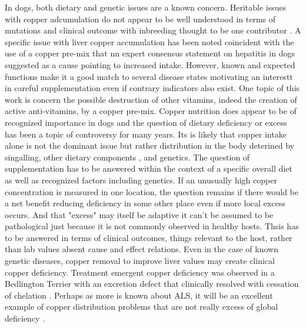 {In dogs, both dietary and genetic issues are a known concern.
Heritable issues with copper adcumulation do not appear to be
well understood in terms of mutations and clinical outcome with inbreeding
thought to be one contributor \cite{PMC3275736}.
A specific issue with liver copper accumulation has
been noted coincident with  the use of a copper pre-mix
that nn expert consensus statement on hepatitis in dogs suggested 
as a cause \cite{PMC6524396} pointing to increased intake. 
However,  known and expected functions
make it a good   match to several  disease states  
motivating an interestt in careful supplementation even if contrary
indicators also exist.  One topic of this work is  concern the possible
destruction of other vitamins, indeed the creation of active
anti-vitamins,  by a copper pre-mix. 
Copper nutrition does appear to be of recognized importance in dogs
and the question of dietary deficiency or excess  
has been a topic of controversy for many years.  Its is  likely
that copper intake alone is not the dominant issue but rather
distribution in the body deterined by singalling, other dietary components
, and genetics.
The question of supplementation has to be answered within the context
of a specific overall diet  as well as recognized  factors including genetics.
If an unusually high copper concentration is measured  in one location, the question
remains if there  would be 
a net benefit reducing deficiency in some other place even if 
more local excess occurs. And that "excess" may itself be adaptive
it can't be assumed to be pathological just because it is not
commonly observed in healthy hosts.  
Thsis has to be answered in terms of clinical outcomes,
things relevant to the host, rather than lab values absent 
cause and effect relations.  
Even in the case of known genetic diseases,
copper removal to improve liver values may create clinical
copper deficiency. 
Treatment emergent copper deficiency was observed in 
a Bedlington Terrier with an excretion defect 
that clinically resolved with cessation of chelation 
\cite{Seguin_Bunch_Iatrogenic_copper_deficiency_associated_2001}.
Perhaps as more is known about ALS, it will be an excellent
example of copper distribution problems that are
not really excess of global deficiency
\cite{10.3389/fnmol.2024.1408159}.

} %



